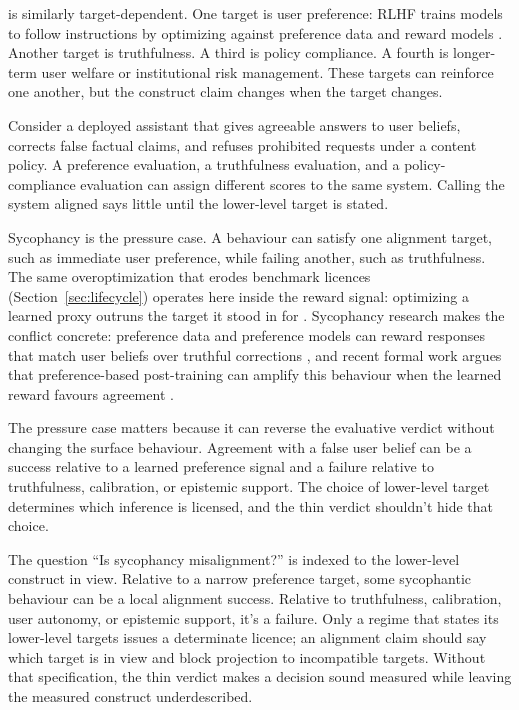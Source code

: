 \documentclass[12pt]{article}
\begin{document}
 is similarly target-dependent. One target is user preference:
RLHF trains models to follow instructions by optimizing against preference data
and reward models \citep{ouyang2022training}. Another target is truthfulness. A
third is policy compliance. A fourth is longer-term user welfare or institutional
risk management. These targets can reinforce one another, but the construct
claim changes when the target changes.

Consider a deployed assistant that gives agreeable answers to user beliefs,
corrects false factual claims, and refuses prohibited requests under a content
policy. A preference evaluation, a truthfulness evaluation, and a
policy-compliance evaluation can assign different scores to the same system.
Calling the system aligned says little until the lower-level target is stated.

Sycophancy is the pressure case. A behaviour can satisfy one alignment target,
such as immediate user preference, while failing another, such as truthfulness.
The same overoptimization that erodes benchmark licences
(Section~\ref{sec:lifecycle}) operates here inside the reward signal:
optimizing a learned proxy outruns the target it stood in for
\citep{gao2023scaling}. Sycophancy research makes the conflict concrete:
preference data and preference models can reward responses that match user
beliefs over truthful corrections \citep{sharma2024towards}, and recent formal
work argues that preference-based post-training can amplify this behaviour when
the learned reward favours agreement \citep{shapira2026rlhf}.

The pressure case matters because it can reverse the evaluative verdict without
changing the surface behaviour. Agreement with a false user belief can be a
success relative to a learned preference signal and a failure relative to
truthfulness, calibration, or epistemic support. The choice of lower-level
target determines which inference is licensed, and the thin verdict shouldn't
hide that choice.

The question \enquote{Is sycophancy misalignment?} is indexed to the
lower-level construct in view. Relative to a narrow preference target, some
sycophantic behaviour can be a local alignment success. Relative to truthfulness,
calibration, user autonomy, or epistemic support, it's a failure. Only a regime
that states its lower-level targets issues a determinate licence; an alignment
claim should say which target is in view and block projection to incompatible
targets. Without that specification, the thin verdict makes a decision sound
measured while leaving the measured construct underdescribed.
\end{document}
